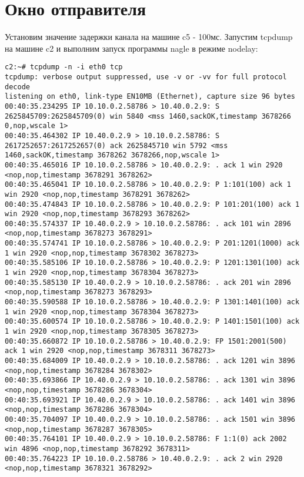 \documentclass[a4paper,12pt]{article}
\begin{document}
\section{Окно отправителя}

Установим значение задержки канала на машине c5 - 100мс. Запустим tcpdump на машине c2 и выполним запуск программы nagle в режиме nodelay: 

\begin{Verbatim}
c2:~# tcpdump -n -i eth0 tcp
tcpdump: verbose output suppressed, use -v or -vv for full protocol decode
listening on eth0, link-type EN10MB (Ethernet), capture size 96 bytes
00:40:35.234295 IP 10.10.0.2.58786 > 10.40.0.2.9: S 2625845709:2625845709(0) win 5840 <mss 1460,sackOK,timestamp 3678266 0,nop,wscale 1>
00:40:35.464302 IP 10.40.0.2.9 > 10.10.0.2.58786: S 2617252657:2617252657(0) ack 2625845710 win 5792 <mss 1460,sackOK,timestamp 3678262 3678266,nop,wscale 1>
00:40:35.465016 IP 10.10.0.2.58786 > 10.40.0.2.9: . ack 1 win 2920 <nop,nop,timestamp 3678291 3678262>
00:40:35.465041 IP 10.10.0.2.58786 > 10.40.0.2.9: P 1:101(100) ack 1 win 2920 <nop,nop,timestamp 3678291 3678262>
00:40:35.474843 IP 10.10.0.2.58786 > 10.40.0.2.9: P 101:201(100) ack 1 win 2920 <nop,nop,timestamp 3678293 3678262>
00:40:35.574337 IP 10.40.0.2.9 > 10.10.0.2.58786: . ack 101 win 2896 <nop,nop,timestamp 3678273 3678291>
00:40:35.574741 IP 10.10.0.2.58786 > 10.40.0.2.9: P 201:1201(1000) ack 1 win 2920 <nop,nop,timestamp 3678302 3678273>
00:40:35.585106 IP 10.10.0.2.58786 > 10.40.0.2.9: P 1201:1301(100) ack 1 win 2920 <nop,nop,timestamp 3678304 3678273>
00:40:35.585130 IP 10.40.0.2.9 > 10.10.0.2.58786: . ack 201 win 2896 <nop,nop,timestamp 3678273 3678293>
00:40:35.590588 IP 10.10.0.2.58786 > 10.40.0.2.9: P 1301:1401(100) ack 1 win 2920 <nop,nop,timestamp 3678304 3678273>
00:40:35.600574 IP 10.10.0.2.58786 > 10.40.0.2.9: P 1401:1501(100) ack 1 win 2920 <nop,nop,timestamp 3678305 3678273>
00:40:35.660872 IP 10.10.0.2.58786 > 10.40.0.2.9: FP 1501:2001(500) ack 1 win 2920 <nop,nop,timestamp 3678311 3678273>
00:40:35.684009 IP 10.40.0.2.9 > 10.10.0.2.58786: . ack 1201 win 3896 <nop,nop,timestamp 3678284 3678302>
00:40:35.693866 IP 10.40.0.2.9 > 10.10.0.2.58786: . ack 1301 win 3896 <nop,nop,timestamp 3678286 3678304>
00:40:35.693921 IP 10.40.0.2.9 > 10.10.0.2.58786: . ack 1401 win 3896 <nop,nop,timestamp 3678286 3678304>
00:40:35.704097 IP 10.40.0.2.9 > 10.10.0.2.58786: . ack 1501 win 3896 <nop,nop,timestamp 3678287 3678305>
00:40:35.764101 IP 10.40.0.2.9 > 10.10.0.2.58786: F 1:1(0) ack 2002 win 4896 <nop,nop,timestamp 3678292 3678311>
00:40:35.764223 IP 10.10.0.2.58786 > 10.40.0.2.9: . ack 2 win 2920 <nop,nop,timestamp 3678321 3678292>



\end{Verbatim}
\end{document}
